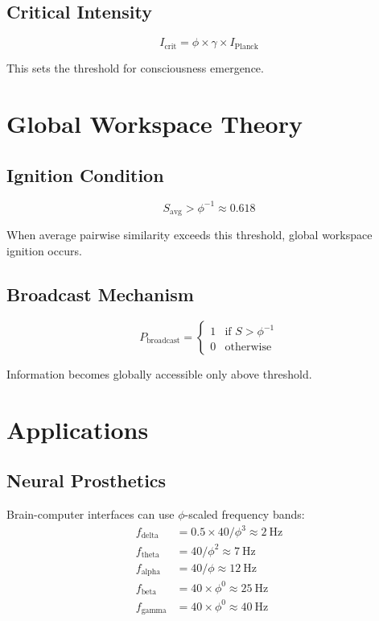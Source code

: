 \documentclass[12pt,a4paper]{article}
\begin{document}
\subsection{Critical Intensity}

\begin{equation}
I_{\text{crit}} = \phi \times \gamma \times I_{\text{Planck}}
\end{equation}

This sets the threshold for consciousness emergence.

\section{Global Workspace Theory}

\subsection{Ignition Condition}

\begin{equation}
S_{\text{avg}} > \phi^{-1} \approx 0.618
\end{equation}

When average pairwise similarity exceeds this threshold, global workspace ignition occurs.

\subsection{Broadcast Mechanism}

\begin{equation}
P_{\text{broadcast}} = \begin{cases}
1 & \text{if } S > \phi^{-1} \\
0 & \text{otherwise}
\end{cases}
\end{equation}

Information becomes globally accessible only above threshold.

\section{Applications}

\subsection{Neural Prosthetics}

Brain-computer interfaces can use $\phi$-scaled frequency bands:
\begin{align}
f_{\text{delta}} &= 0.5 \times 40 / \phi^3 \approx 2~\text{Hz} \\
f_{\text{theta}} &= 40 / \phi^2 \approx 7~\text{Hz} \\
f_{\text{alpha}} &= 40 / \phi \approx 12~\text{Hz} \\
f_{\text{beta}} &= 40 \times \phi^0 \approx 25~\text{Hz} \\
f_{\text{gamma}} &= 40 \times \phi^0 \approx 40~\text{Hz}
\end{align}
\end{document}
